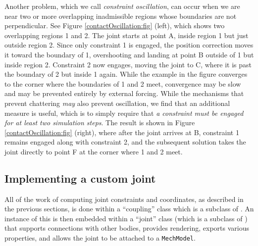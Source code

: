 Another problem, which we call {\it constraint oscillation}, can occur
when we are near two or more overlapping inadmissible regions whose
boundaries are not perpendicular.  See
Figure \ref{contactOscillation:fig} (left), which shows two
overlapping regions 1 and 2. The joint starts at point A, inside
region 1 but just outside region 2. Since only constraint 1 is
engaged, the position correction moves it toward the boundary of 1,
overshooting and landing at point B outside of 1 but inside region 2.
Constraint 2 now engages, moving the joint to C, where it is past the
boundary of 2 but inside 1 again. While the example in the figure
converges to the corner where the boundaries of 1 and 2 meet,
convergence may be slow and may be prevented entirely by external
forcing. While the mechanisms that prevent chattering {\it may} also
prevent oscillation, we find that an additional measure is useful,
which is to simply require that {\it a constraint must be engaged for
at least two simulation steps}. The result is shown in
Figure \ref{contactOscillation:fig} (right), where after the joint
arrives at B, constraint 1 remains engaged along with constraint 2,
and the subsequent solution takes the joint directly to point F at the
corner where 1 and 2 meet.

\subsection{Implementing a custom joint}
\label{CustomJointImplementation:sec}

All of the work of computing joint constraints and coordinates, as
described in the previous sections, is done within a ``coupling''
class which is a subclass of
.
An instance of this is then embedded within a ``joint'' class 
(which is a subclass of
)
that supports connections with other bodies, provides rendering,
exports various properties, and allows the joint to be attached to a
{\tt MechModel}.

